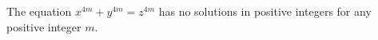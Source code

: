 The equation $x^{4m} + y^{4m} = z^{4m}$ has no solutions in positive integers for any positive integer $m$.
